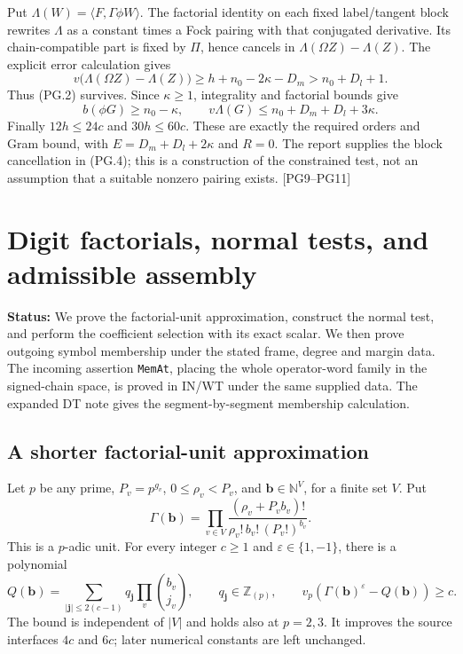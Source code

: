 \documentclass[11pt,a4paper]{article}
\numberwithin{equation}{section}
\theoremstyle{remark}\newtheorem{remark}[theorem]{Remark}
\newcommand{\status}[1]{\textbf{Status:} #1}
\begin{document}
Put $\Lambda(W)=\langle F,\Gamma\phi W\rangle$. The factorial identity on each fixed label/tangent block rewrites $\Lambda$ as a constant times a Fock pairing with that conjugated derivative. Its chain-compatible part is fixed by $\Pi$, hence cancels in $\Lambda(\Omega Z)-\Lambda(Z)$. The explicit error calculation gives
\[
 v\bigl(\Lambda(\Omega Z)-\Lambda(Z)\bigr)
 \ge h+n_0-2\kappa-D_m>n_0+D_l+1.
 \tag{PG.4}
\]
Thus (PG.2) survives. Since $\kappa\ge1$, integrality and factorial bounds give
\[
 b(\phi G)\ge n_0-\kappa,\qquad
 v\Lambda(G)\le n_0+D_m+D_l+3\kappa.
 \tag{PG.5}
\]
Finally $12h\le24c$ and $30h\le60c$. These are exactly the required orders and Gram bound, with $E=D_m+D_l+2\kappa$ and \emph{$R=0$}. The report supplies the block cancellation in (PG.4); this is a construction of the constrained test, not an assumption that a suitable nonzero pairing exists. \textsf{[PG9--PG11]}

\section{Digit factorials, normal tests, and admissible assembly}
\label{sec:digit-tests}

\status{We prove the factorial-unit approximation, construct the normal test, and perform the coefficient selection with its exact scalar. We then prove outgoing symbol membership under the stated frame, degree and margin data. The incoming assertion \texttt{MemAt}, placing the whole operator-word family in the signed-chain space, is proved in IN/WT under the same supplied data. The expanded DT note gives the segment-by-segment membership calculation.}

\subsection{A shorter factorial-unit approximation}

Let $p$ be any prime, $P_v=p^{g_v}$, $0\le\rho_v<P_v$, and $\mathbf b\in\mathbb N^V$, for a finite set $V$. Put
\[
 \Gamma(\mathbf b)=\prod_{v\in V}
 \frac{(\rho_v+P_vb_v)!}{\rho_v!\,b_v!\,(P_v!)^{b_v}}.
 \tag{DT.1}
\]
This is a $p$-adic unit. For every integer $c\ge1$ and $\varepsilon\in\{1,-1\}$, there is a polynomial
\[
 Q(\mathbf b)=\sum_{|\mathbf j|\le2(c-1)}q_{\mathbf j}
       \prod_v\binom{b_v}{j_v},\qquad q_{\mathbf j}\in\mathbb Z_{(p)},
 \qquad v_p(\Gamma(\mathbf b)^\varepsilon-Q(\mathbf b))\ge c.
 \tag{DT.2}
\]
The bound is independent of $|V|$ and holds also at $p=2,3$. It improves the source interfaces $4c$ and $6c$; later numerical constants are left unchanged.
\end{document}
